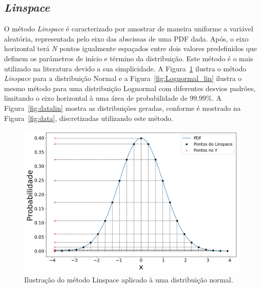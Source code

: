\subsection{\textit{Linspace}}
O método \textit{Linspace} é caracterizado por amostrar de maneira uniforme a variável aleatória, representada pelo eixo das abscissas de uma \ac{PDF} dada. Após, o eixo horizontal terá \textit{N} pontos igualmente espaçados entre dois valores predefinidos que definem os parâmetros de início e término da distribuição. Este método é o mais utilizado na literatura devido a sua simplicidade. A Figura~\ref{fig:linspace_curve} ilustra o método \textit{Linspace} para a distribuição Normal e a Figura~\ref{fig:Lognormal_lin} ilustra o mesmo método para uma distribuição Lognormal com diferentes desvios padrões, limitando o eixo horizontal à uma área de probabilidade de $99.99\%$. A Figura~\ref{fig:datalin} mostra as distribuições geradas, conforme é mostrado na Figura~\ref{fig:data}, discretizadas utilizando este método.

\begin{figure}[H]
	\centering
	\includegraphics[width=0.7\linewidth]{./figuras/normal_1}
	\caption{Ilustração do método Linspace aplicado à uma distribuição normal.}
	\label{fig:linspace_curve}
\end{figure}

